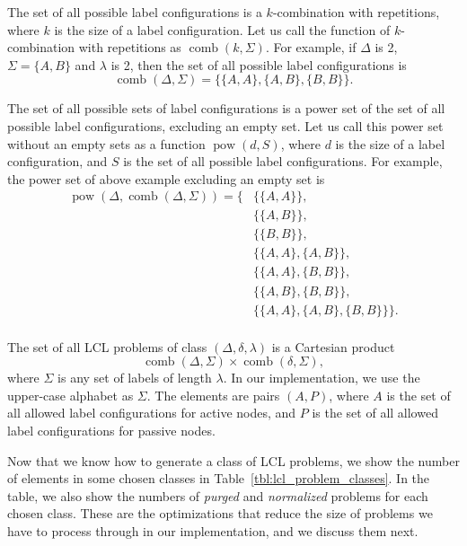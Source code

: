 The set of all possible label configurations is a $k$-combination with repetitions, where $k$ is the size of a label configuration.
Let us call the function of $k$-combination with repetitions as $\operatorname{comb}(k, \Sigma)$.
For example, if $\Delta$ is 2, $\Sigma=\{A, B\}$ and $\lambda$ is 2, then the set of all possible label configurations is
$$ \operatorname{comb}(\Delta, \Sigma) = \{ \{A, A\}, \{A, B\}, \{B, B\} \}. $$

The set of all possible sets of label configurations is a power set of the set of all possible label configurations, excluding an empty set.
Let us call this power set without an empty sets as a function $\operatorname{pow}(d, S)$, where $d$ is the size of a label configuration, and $S$ is the set of all possible label configurations.
For example, the power set of above example excluding an empty set is
\begin{align*}
  \operatorname{pow}(\Delta, \operatorname{comb}(\Delta, \Sigma)) =  \{&\{\{A, A\}\}, \\
    &\{\{A, B\}\}, \\
    &\{\{B, B\}\}, \\
    &\{\{A, A\}, \{A, B\}\}, \\
    &\{\{A, A\}, \{B, B\}\}, \\
    &\{\{A, B\}, \{B, B\}\}, \\
    &\{\{A, A\}, \{A, B\}, \{B, B\}\} \}.\\
\end{align*}

The set of all LCL problems of class $(\Delta, \delta, \lambda)$ is a Cartesian product
$$ \operatorname{comb}(\Delta, \Sigma) \times \operatorname{comb}(\delta, \Sigma),$$
where $\Sigma$ is any set of labels of length $\lambda$.
In our implementation, we use the upper-case alphabet as $\Sigma$.
The elements are pairs $(A, P)$, where $A$ is the set of all allowed label configurations for active nodes, and $P$ is the set of all allowed label configurations for passive nodes.

Now that we know how to generate a class of LCL problems, we show the number of elements in some chosen classes in Table~\ref{tbl:lcl_problem_classes}.
In the table, we also show the numbers of \emph{purged} and \emph{normalized} problems for each chosen class.
These are the optimizations that reduce the size of problems we have to process through in our implementation, and we discuss them next.

